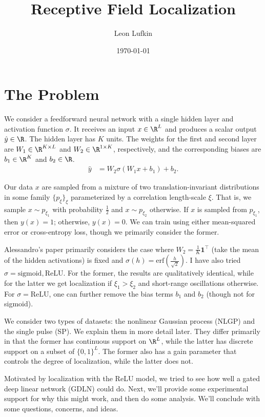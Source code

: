 \documentclass{article}
\title{Receptive Field Localization}
\author{Leon Lufkin}
\date{\today}
\begin{document}
\section{The Problem}
We consider a feedforward neural network with a single hidden layer and activation function $\sigma$.
It receives an input $x \in \R^L$ and produces a scalar output $\hat{y} \in \R$.
The hidden layer has $K$ units.
The weights for the first and second layer are $W_1 \in \R^{K \times L}$ and $W_2 \in \R^{1 \times K}$, respectively, and the corresponding biases are $b_1 \in \R^K$ and $b_2 \in \R$.
\begin{align}
  \hat{y} &= W_2 \sigma( W_1 x + b_1 ) + b_2. \label{eq:model}
\end{align}

Our data $x$ are sampled from a mixture of two translation-invariant distributions in some family $\{ p_\xi \}_{\xi}$ parameterized by a correlation length-scale $\xi$.
That is, we sample $x \sim p_{\xi_1}$ with probability $\frac{1}{2}$ and $x \sim p_{\xi_2}$ otherwise.
If $x$ is sampled from $p_{\xi_1}$, then $y(x) = 1$; otherwise, $y(x) = 0$. 
We can train using either mean-squared error or cross-entropy loss, though we primarily consider the former. 

Alessandro's paper primarily considers the case where $W_2 = \frac{1}{K} \mathbf{1}^\top$ (take the mean of the hidden activations) is fixed and $\sigma(h) = \text{erf}(\frac{h}{\sqrt{2}})$.
I have also tried $\sigma = \text{sigmoid}, \text{ReLU}$.
For the former, the results are qualitatively identical, while for the latter we get localization if $\xi_1 > \xi_2$ and short-range oscillations otherwise.
For $\sigma = \text{ReLU}$, one can further remove the bias terms $b_1$ and $b_2$ (though not for sigmoid).

We consider two types of datasets: the nonlinear Gaussian process (NLGP) and the single pulse (SP).
We explain them in more detail later.
They differ primarily in that the former has continuous support on $\R^L$, while the latter has discrete support on a subset of $\{ 0, 1 \}^L$.
The former also has a gain parameter that controls the degree of localization, while the latter does not. 

Motivated by localization with the ReLU model, we tried to see how well a gated deep linear network (GDLN) could do.
Next, we'll provide some experimental support for why this might work, and then do some analysis. 
We'll conclude with some questions, concerns, and ideas.
\end{document}
